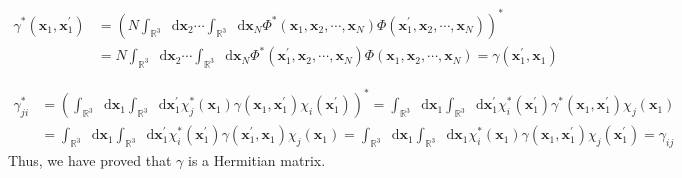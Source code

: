 \documentclass[a4paper]{book}
\newcommand*{\dif}{\mathop{}\!\mathrm{d}}
\begin{document}
	\begin{solution}

	\begin{align*}
		\gamma^*( \boldsymbol{x}_1 , \boldsymbol{x}^\prime_1 ) &= \left( N \int_{\mathbb{R}^3} \dif \boldsymbol{x}_2 \cdots \int_{\mathbb{R}^3} \dif \boldsymbol{x}_N \Phi^*( \boldsymbol{x}_1 , \boldsymbol{x}_2 , \cdots , \boldsymbol{x}_N ) \Phi( \boldsymbol{x}^\prime_1 , \boldsymbol{x}_2 , \cdots , \boldsymbol{x}_N ) \right)^* \\
		&= N \int_{\mathbb{R}^3} \dif \boldsymbol{x}_2 \cdots \int_{\mathbb{R}^3} \dif \boldsymbol{x}_N \Phi^*( \boldsymbol{x}^\prime_1 , \boldsymbol{x}_2 , \cdots , \boldsymbol{x}_N ) \Phi( \boldsymbol{x}_1 , \boldsymbol{x}_2 , \cdots , \boldsymbol{x}_N ) = \gamma( \boldsymbol{x}^\prime_1 , \boldsymbol{x}_1 )
	\end{align*}
	
	\begin{align*}
		\gamma^*_{ji} &= \left( \int_{\mathbb{R}^3} \dif \boldsymbol{x}_1 \int_{\mathbb{R}^3} \dif \boldsymbol{x}^\prime_1 \chi^*_j( \boldsymbol{x}_1 ) \gamma( \boldsymbol{x}_1 , \boldsymbol{x}^\prime_1 ) \chi_i( \boldsymbol{x}^\prime_1 ) \right)^* = \int_{\mathbb{R}^3} \dif \boldsymbol{x}_1 \int_{\mathbb{R}^3} \dif \boldsymbol{x}^\prime_1 \chi^*_i( \boldsymbol{x}^\prime_1 ) \gamma^*( \boldsymbol{x}_1 , \boldsymbol{x}^\prime_1 ) \chi_j( \boldsymbol{x}_1 ) \\
		&= \int_{\mathbb{R}^3} \dif \boldsymbol{x}_1 \int_{\mathbb{R}^3} \dif \boldsymbol{x}^\prime_1 \chi^*_i( \boldsymbol{x}^\prime_1 ) \gamma( \boldsymbol{x}^\prime_1 , \boldsymbol{x}_1 ) \chi_j( \boldsymbol{x}_1 ) = \int_{\mathbb{R}^3} \dif \boldsymbol{x}_1 \int_{\mathbb{R}^3} \dif \boldsymbol{x}_1 \chi^*_i( \boldsymbol{x}_1 ) \gamma( \boldsymbol{x}_1 , \boldsymbol{x}^\prime_1 ) \chi_j( \boldsymbol{x}^\prime_1 ) = \gamma_{ij}
	\end{align*}
	Thus, we have proved that $\gamma$ is a Hermitian matrix.
	
	\end{solution}	
	
	
\end{document}

